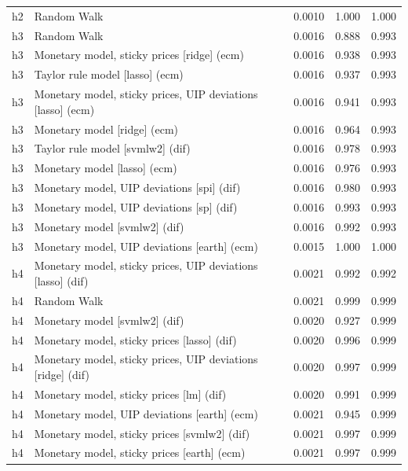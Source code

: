 \begin{ThreePartTable}
\begin{longtable}[t]{cp{5.5cm}ccc}
h2 & \raggedright Random Walk & 0.0010 & 1.000 & 1.000\\
\addlinespace
h3 & \raggedright Random Walk & 0.0016 & 0.888 & 0.993\\
h3 & \raggedright Monetary model, sticky prices [ridge] (ecm) & 0.0016 & 0.938 & 0.993\\
h3 & \raggedright Taylor rule model [lasso] (ecm) & 0.0016 & 0.937 & 0.993\\
h3 & \raggedright Monetary model, sticky prices, UIP deviations [lasso] (ecm) & 0.0016 & 0.941 & 0.993\\
h3 & \raggedright Monetary model [ridge] (ecm) & 0.0016 & 0.964 & 0.993\\
h3 & \raggedright Taylor rule model [svmlw2] (dif) & 0.0016 & 0.978 & 0.993\\
h3 & \raggedright Monetary model [lasso] (ecm) & 0.0016 & 0.976 & 0.993\\
h3 & \raggedright Monetary model, UIP deviations [spi] (dif) & 0.0016 & 0.980 & 0.993\\
h3 & \raggedright Monetary model, UIP deviations [sp] (dif) & 0.0016 & 0.993 & 0.993\\
h3 & \raggedright Monetary model [svmlw2] (dif) & 0.0016 & 0.992 & 0.993\\
h3 & \raggedright Monetary model, UIP deviations [earth] (ecm) & 0.0015 & 1.000 & 1.000\\
\addlinespace
h4 & \raggedright Monetary model, sticky prices, UIP deviations [lasso] (dif) & 0.0021 & 0.992 & 0.992\\
h4 & \raggedright Random Walk & 0.0021 & 0.999 & 0.999\\
h4 & \raggedright Monetary model [svmlw2] (dif) & 0.0020 & 0.927 & 0.999\\
h4 & \raggedright Monetary model, sticky prices [lasso] (dif) & 0.0020 & 0.996 & 0.999\\
h4 & \raggedright Monetary model, sticky prices, UIP deviations [ridge] (dif) & 0.0020 & 0.997 & 0.999\\
h4 & \raggedright Monetary model, sticky prices [lm] (dif) & 0.0020 & 0.991 & 0.999\\
h4 & \raggedright Monetary model, UIP deviations [earth] (ecm) & 0.0021 & 0.945 & 0.999\\
h4 & \raggedright Monetary model, sticky prices [svmlw2] (dif) & 0.0021 & 0.997 & 0.999\\
h4 & \raggedright Monetary model, sticky prices [earth] (ecm) & 0.0021 & 0.997 & 0.999\\

\end{longtable}
\end{ThreePartTable}
